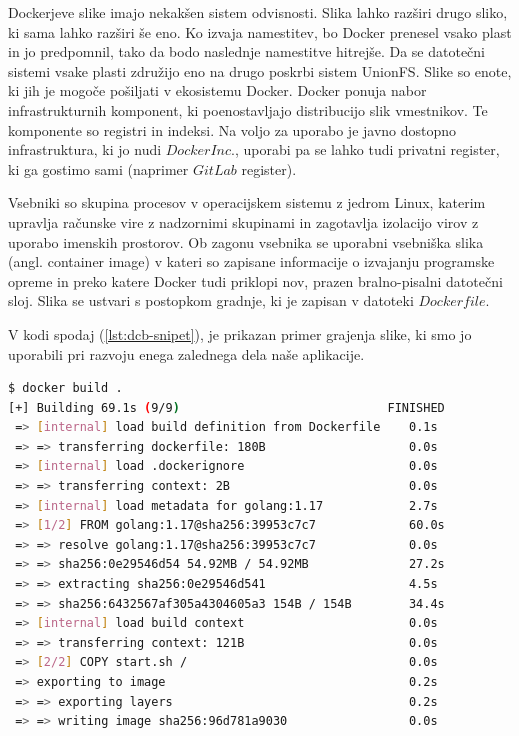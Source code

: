 \documentclass[a4paper, 12pt]{book}
\begin{document}
Dockerjeve slike imajo nekakšen sistem odvisnosti. Slika lahko razširi drugo sliko, ki sama lahko razširi še eno. Ko izvaja namestitev, bo Docker prenesel vsako plast in jo predpomnil, tako da bodo naslednje namestitve hitrejše. Da se datotečni sistemi vsake plasti združijo eno na drugo poskrbi sistem UnionFS.  Slike so enote, ki jih je mogoče pošiljati v ekosistemu Docker. Docker ponuja nabor infrastrukturnih komponent, ki poenostavljajo distribucijo slik vmestnikov. Te komponente so registri in indeksi. Na voljo za uporabo je javno dostopno infrastruktura, ki jo nudi $Docker Inc.$, uporabi pa se lahko tudi privatni register, ki ga gostimo sami (naprimer $GitLab$ register).

Vsebniki so skupina procesov v operacijskem sistemu z jedrom Linux, katerim upravlja računske vire z nadzornimi skupinami in zagotavlja izolacijo virov z uporabo imenskih prostorov. Ob zagonu vsebnika se uporabni vsebniška slika (angl. container image) v kateri so zapisane informacije o izvajanju programske opreme in preko katere Docker tudi priklopi nov, prazen bralno-pisalni datotečni sloj. Slika se ustvari s postopkom gradnje, ki je zapisan v datoteki $Dockerfile$. 

V kodi spodaj (\ref{lst:dcb-snipet}), je prikazan primer grajenja slike, ki smo jo uporabili pri razvoju enega zalednega dela naše aplikacije.
\begin{lstlisting}[language=bash, style=mystyle,caption={Grajenje slike docker vmestnika},label=lst:dcb-snipet]
$ docker build .          
[+] Building 69.1s (9/9)                             FINISHED
 => [internal] load build definition from Dockerfile    0.1s
 => => transferring dockerfile: 180B                    0.0s
 => [internal] load .dockerignore                       0.0s
 => => transferring context: 2B                         0.0s
 => [internal] load metadata for golang:1.17            2.7s
 => [1/2] FROM golang:1.17@sha256:39953c7c7             60.0s
 => => resolve golang:1.17@sha256:39953c7c7             0.0s
 => => sha256:0e29546d54 54.92MB / 54.92MB              27.2s
 => => extracting sha256:0e29546d541                    4.5s
 => => sha256:6432567af305a4304605a3 154B / 154B        34.4s
 => [internal] load build context                       0.0s
 => => transferring context: 121B                       0.0s
 => [2/2] COPY start.sh /                               0.0s 
 => exporting to image                                  0.2s 
 => => exporting layers                                 0.2s 
 => => writing image sha256:96d781a9030                 0.0s 
\end{lstlisting}
\end{document}
